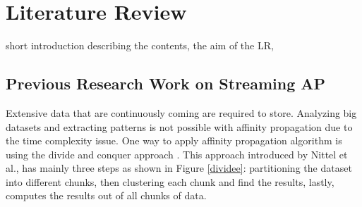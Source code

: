 \documentclass[../UNBThesis2.tex]{subfiles}
\begin{document}
\chapter{Literature Review}

short introduction describing the contents, the aim of the LR,










\section{Previous Research Work on Streaming AP }
Extensive data that are continuously coming are required to store. Analyzing big datasets and extracting patterns is not possible with affinity propagation due to the time complexity issue.
One way to apply affinity propagation algorithm is using the divide and conquer approach \cite{khalilian2016data}. This approach introduced by Nittel et al.\cite{nittel2004scaling}, has mainly three steps as shown in Figure \ref{dividee}: partitioning the dataset into different chunks, then clustering each chunk and find the results, lastly, computes the results out of all chunks of data. 
\end{document}
